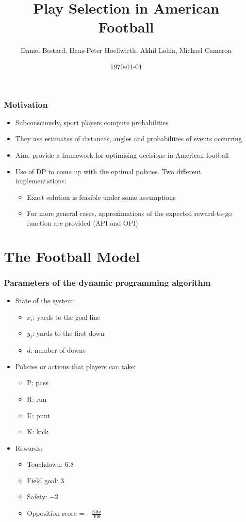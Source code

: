 \documentclass{beamer}
\title[DP in Football]{Play Selection in American Football}
\author[]{Daniel Bestard, Hans-Peter Hoellwirth, Akhil Lohia, Michael Cameron}
\institute[BGSE]{Barcelona Graduate School of Economics}
\date{\today}
\begin{document}
\frame{\titlepage}

\begin{frame}
\frametitle{Motivation}
\begin{itemize}
\item Subconsciously, sport players compute probabilities
\pause
\item They use estimates of distances, angles and probabilities of events occurring
\pause
\item Aim: provide a framework for optimising decisions in American football
\pause
\item Use of DP to come up with the optimal policies. Two different implementations:
\pause
\begin{itemize}
\item Exact solution is feasible under some assumptions
\pause
\item For more general cases, approximations of the expected reward-to-go function are provided (API and OPI)
\end{itemize}
\end{itemize}
\end{frame}

\section{The Football Model}
\begin{frame}
\frametitle{Parameters of the dynamic programming algorithm}

\begin{itemize}
\item State of the system:
\begin{itemize}
\item $x_{i}$: yards to the goal line
\item $y_{i}$: yards to the first down
\item $d$: number of downs
\end{itemize}
\pause
\item Policies or actions that players can take:
\begin{itemize}
\item P: pass
\item R: run
\item U: punt
\item K: kick
\end{itemize}
\pause
\item Rewards:
\begin{itemize}
\item Touchdown: $6.8$
\item Field goal: $3$
\item Safety: $-2$
\item Opposition score = $ -\frac{6.8 x}{100}$
\end{itemize}
\end{itemize}
\end{frame}
\end{document}
